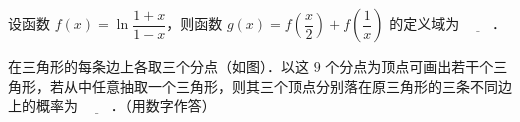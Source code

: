 \begin{question}
设函数 $f(x) = \ln\dfrac{1+x}{1-x}$，则函数 $g(x) = f\left(\dfrac{x}{2}\right) + f\left(\dfrac{1}{x}\right)$ 的定义域为 $\underline{\hspace{2em}}$．

\Needspace{0.4\textheight}
\end{question}
\begin{question}
在三角形的每条边上各取三个分点（如图）．以这 $9$ 个分点为顶点可画出若干个三角形，若从中任意抽取一个三角形，则其三个顶点分别落在原三角形的三条不同边上的概率为 $\underline{\hspace{2em}}$．（用数字作答）
\nopagebreak[4]
\begin{center}\end{center}
\nopagebreak[4]
\end{question}


